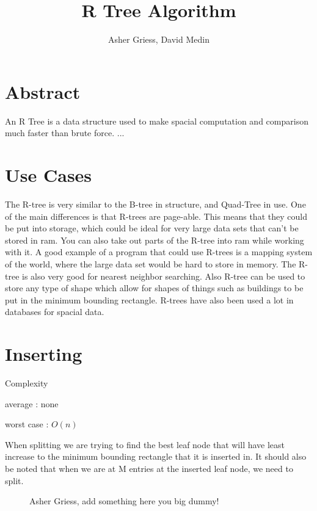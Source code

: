 \documentclass{article}
\author{Asher Griess, David Medin}
\title{R Tree Algorithm}
\begin{document}
\maketitle

\section{Abstract}
An R Tree is a data structure used to make spacial computation and comparison much faster than brute force.  ...

\section{Use Cases}
The R-tree is very similar to the B-tree in structure, and Quad-Tree in use. One of the main differences is that
R-trees are page-able. This means that they could be put into storage, which could be ideal for very large data sets 
that can't be stored in ram. \cite{guttman_1984_rtrees} You can also take out parts of the R-tree into ram while working with it. A good example
of a program that could use R-trees is a mapping system of the world, where the large data set would be hard to store in memory.
The R-tree is also very good for nearest neighbor searching. Also R-tree can be used to store any type of shape which allow for shapes
of things such as buildings to be put in the minimum bounding rectangle. R-trees have also been used a lot in databases for spacial data.


\section{Inserting}
Complexity

average : none

worst case : $O(n)$

When splitting we are trying to find the best leaf node
that will have least increase to the minimum bounding rectangle that it is inserted in.
It should also be noted that when we are at M entries at the inserted leaf node, we
need to split.

\begin{figure}
\caption{Asher Griess, add something here you big dummy!}
\centering
{}
\end{figure}
\end{document}
